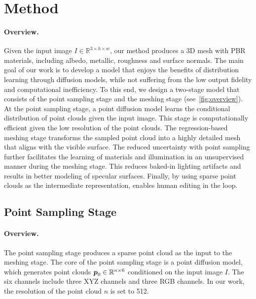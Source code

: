 \section{Method}
\label{sec:method}

\paragraph{\method Overview.}
Given the input image $I \in \mathbb{R}^{3 \times h \times w}$, our method produces a 3D mesh with PBR materials, including albedo, metallic, roughness and surface normals. The main goal of our work is to develop a model that enjoys the benefits of distribution learning through diffusion models, while not suffering from the low output fidelity and computational inefficiency. To this end, we design a two-stage model that consists of the point sampling stage and the meshing stage (see~\cref{fig:overview}). At the point sampling stage, a point diffusion model learns the conditional distribution of point clouds given the input image. This stage is computationally efficient given the low resolution of the point clouds. The regression-based meshing stage transforms the sampled point cloud into a highly detailed mesh that aligns with the visible surface. The reduced uncertainty with point sampling further facilitates the learning of materials and illumination in an unsupervised manner during the meshing stage. This reduces baked-in lighting artifacts and results in better modeling of specular surfaces. Finally, by using sparse point clouds as the intermediate representation, \method enables human editing in the loop.

\subsection{Point Sampling Stage}
\paragraph{Overview.}
The point sampling stage produces a sparse point cloud as the input to the meshing stage. The core of the point sampling stage is a point diffusion model, which generates point clouds $\boldsymbol{p}_0 \in \mathbb{R}^{n \times 6}$ conditioned on the input image $I$. The six channels include three XYZ channels and three RGB channels. In our work, the resolution of the point cloud $n$ is set to 512.


